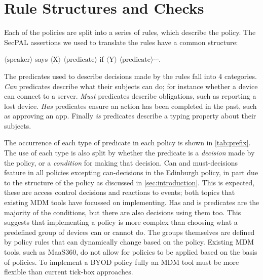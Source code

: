 \documentclass[conference,twocolumn]{IEEEtran}
\begin{document}
\section{Rule Structures and Checks}

Each of the policies are split into a series of rules, which describe the policy.
The SecPAL assertions we used to translate the rules have a common structure:

\begin{center}\ttfamily\footnotesize%
  \newcommand{\sptoken}[1]{$\langle\text{#1}\rangle$}
  \sptoken{speaker} says \sptoken{X} \sptoken{predicate} if \sptoken{Y} \sptoken{predicate}$\cdots$.
\end{center}

The predicates used to describe decisions made by the rules fall into 4 categories.
\emph{Can} predicates describe what their subjects can do; for instance whether a device can connect to a server.
\emph{Must} predicates describe obligations, such as reporting a lost device.
\emph{Has} predicates ensure an action has been completed in the past, such as approving an app.
Finally \emph{is} predicates describe a typing property about their subjects.

The occurrence of each type of predicate in each policy is shown in \autoref{tab:prefix}.
The use of each type is also split by whether the predicate is a \emph{decision} made by the policy, or a \emph{condition} for making that decision.
Can and must-decisions feature in all policies excepting can-decisions in the Edinburgh policy, in part due to the structure of the policy as discussed in \autoref{sec:introduction}.
This is expected, these are access control decisions and reactions to events; both topics that existing MDM tools have focussed on implementing.
Has and is predicates are the majority of the conditions, but there are also decisions using them too.
This suggests that implementing a policy is more complex than choosing what a predefined group of devices can or cannot do.
The groups themselves are defined by policy rules that can dynamically change based on the policy.
Existing MDM tools, such as MaaS360, do not allow for policies to be applied based on the basis of policies.
To implement a BYOD policy fully an MDM tool must be more flexible than current tick-box approaches.
\end{document}
